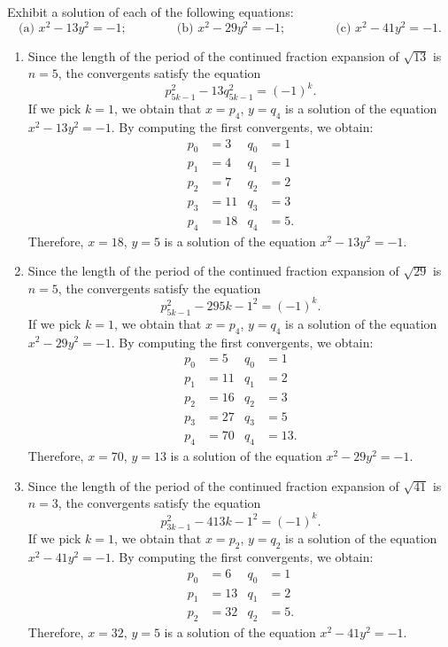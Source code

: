 \begin{exercise}
    Exhibit a solution of each of the following equations:
    $$\text{(a) } x^2 - 13y^2 = -1; \qquad \qquad \text{(b) } x^2 - 29y^2 = -1; \qquad \qquad \text{(c) } x^2 - 41y^2 = -1.$$ 
\end{exercise}

\begin{solution}
    \begin{enumerate}
        \item Since the length of the period of the continued fraction expansion of $\sqrt{13}$ is $n = 5$, the convergents satisfy the equation
        $$p_{5k-1}^2 - 13q_{5k-1}^2 = (-1)^k.$$
        If we pick $k = 1$, we obtain that $x = p_4$, $y = q_4$ is a solution of the equation $x^2 - 13y^2 = -1$. 
        By computing the first convergents, we obtain:
        \begin{align*}
            p_0 &= 3 & q_0 &= 1 \\
            p_1 &= 4 & q_1 &= 1  \\
            p_2 &= 7 & q_2 &= 2 \\
            p_3 &= 11 & q_3 &= 3 \\
            p_4 &= 18 & q_4 &= 5.
        \end{align*}
        Therefore, $x = 18$, $y = 5$ is a solution of the equation $x^2 - 13y^2 = -1$. 
        \item Since the length of the period of the continued fraction expansion of $\sqrt{29}$ is $n = 5$, the convergents satisfy the equation
        $$p_{5k-1}^2 - 29{5k-1}^2 = (-1)^k.$$
        If we pick $k = 1$, we obtain that $x = p_4$, $y = q_4$ is a solution of the equation $x^2 - 29y^2 = -1$. 
        By computing the first convergents, we obtain:
        \begin{align*}
            p_0 &= 5 & q_0 &= 1 \\
            p_1 &= 11 & q_1 &= 2  \\
            p_2 &= 16 & q_2 &= 3 \\
            p_3 &= 27 & q_3 &= 5 \\
            p_4 &= 70 & q_4 &= 13.
        \end{align*}
        Therefore, $x = 70$, $y = 13$ is a solution of the equation $x^2 - 29y^2 = -1$. 
        \item Since the length of the period of the continued fraction expansion of $\sqrt{41}$ is $n = 3$, the convergents satisfy the equation
        $$p_{3k-1}^2 - 41{3k-1}^2 = (-1)^k.$$
        If we pick $k = 1$, we obtain that $x = p_2$, $y = q_2$ is a solution of the equation $x^2 - 41y^2 = -1$. 
        By computing the first convergents, we obtain:
        \begin{align*}
            p_0 &= 6 & q_0 &= 1 \\
            p_1 &= 13 & q_1 &= 2  \\
            p_2 &= 32 & q_2 &= 5.
        \end{align*}
        Therefore, $x = 32$, $y = 5$ is a solution of the equation $x^2 - 41y^2 = -1$.  \\
    \end{enumerate}
\end{solution}

